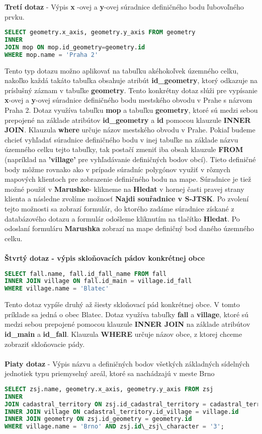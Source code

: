 {\bf Tretí dotaz} - Výpis {\bf x} -ovej a {\bf y}-ovej súradnice definičného bodu ľubovoľného prvku.
\begin{lstlisting}[language=SQL]
SELECT geometry.x_axis, geometry.y_axis FROM geometry 
INNER 
JOIN mop ON mop.id_geometry=geometry.id 
WHERE mop.name = 'Praha 2'
\end{lstlisting}
Tento typ dotazu možno aplikovať na tabuľku akéhokoľvek územného celku, nakoľko každá takáto tabuľka obsahuje atribút {\bf id\_geometry}, ktorý odkazuje na príslušný záznam v tabuľke {\bf geometry}. Tento konkrétny dotaz slúži pre vypísanie {\bf x}-ovej a {\bf y}-ovej súradnice definičného bodu mestského obvodu v Prahe s názvom Praha 2. Dotaz využíva tabuľku {\bf mop} a tabuľku {\bf geometry}, ktoré sú medzi sebou prepojené na základe atribútov {\bf id\_geometry} a {\bf id} pomocou klauzule {\bf INNER JOIN}. Klauzula {\bf where} určuje názov mestského obvodu v Prahe. Pokiaľ budeme chcieť vyhľadať súradnice definičného bodu v inej tabuľke na základe názvu územného celku tejto tabuľky, tak postačí zmeniť iba obsah klauzule {\bf FROM} (napríklad na {\bf 'village'} pre vyhľadávanie definičných bodov obcí). Tieto definičné body môžme rovnako ako v prípade súradníc polygónov využiť v rôznych mapových klientoch pre zobrazenie definičného bodu na mape. Súradnice je tiež možné použiť v {\bf Marushke}- klikneme na {\bf Hledat} v hornej časti pravej strany klienta a následne zvolíme možnosť {\bf Najdi souřadnice v S-JTSK}. Po zvolení tejto možnosti sa zobrazí formulár, do ktorého zadáme súradnice získané z databázového dotazu a formulár odošleme kliknutím na tlačítko {\bf Hledat}. Po odoslaní formuláru {\bf Marushka} zobrazí na mape definičný bod daného územného celku.
\\ \\
{\bf Štvrtý dotaz - výpis skloňovacích pádov konkrétnej obce}
\begin{lstlisting}[language=SQL]
SELECT fall.name, fall.id_fall_name FROM fall 
INNER JOIN village ON fall.id_main = village.id_fall 
WHERE village.name = 'Blatec'
\end{lstlisting}
Tento dotaz vypíše druhý až šiesty skloňovací pád konkrétnej obce. V tomto príklade sa jedná o obec Blatec. Dotaz využíva tabuľky {\bf fall} a {\bf village}, ktoré sú medzi sebou prepojené pomocou klauzule {\bf INNER JOIN} na základe atribútov {\bf id\_main} a {\bf id\_fall}. Klauzula {\bf WHERE} určuje názov obce, z ktorej chceme zobraziť skloňovacie pády. \\ \\
{\bf Piaty dotaz} - Výpis názvu a definičných bodov všetkých základných sídelných jednotiek typu priemyselný areál, ktoré sa nachádzajú v meste Brno
\begin{lstlisting}[language=SQL]
SELECT zsj.name, geometry.x_axis, geometry.y_axis FROM zsj 
INNER 
JOIN cadastral_territory ON zsj.id_cadastral_territory = cadastral_territory.id
INNER JOIN village ON cadastral_territory.id_village = village.id 
INNER JOIN geometry ON zsj.id_geometry = geometry.id 
WHERE village.name = 'Brno' AND zsj.id\_zsj\_character = '3';
\end{lstlisting}

